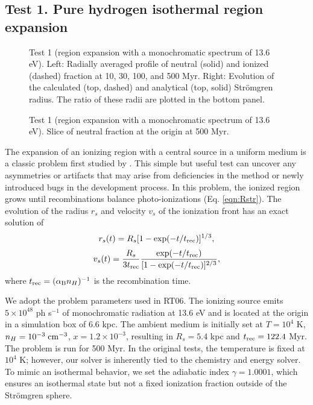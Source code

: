 \documentclass[useAMS,usenatbib]{mn2e}
\begin{document}
\subsection{Test 1. Pure hydrogen isothermal \hii region
  expansion}
\label{sec:test1}

\begin{figure*}
  \caption{\label{fig:test1_ifront} Test 1 (\hii region
    expansion with a monochromatic spectrum of 13.6 eV).  Left:
    Radially averaged profile of neutral (solid) and ionized (dashed)
    fraction at 10, 30, 100, and 500 Myr.  Right: Evolution of the
    calculated (top, dashed) and analytical (top, solid) Str\"{o}mgren
    radius.  The ratio of these radii are plotted in the bottom panel.}
\end{figure*}

\begin{figure}
  \caption{\label{fig:test1_HI} Test 1 (\hii region expansion
    with a monochromatic spectrum of 13.6 eV). Slice of neutral
    fraction at the origin at 500 Myr.}
\end{figure}

The expansion of an ionizing region with a central source in a uniform
medium is a classic problem first studied by \citet{Stroemgren39}.
This simple but useful test can uncover any asymmetries or artifacts
that may arise from deficiencies in the method or newly introduced
bugs in the development process.  In this problem, the ionized region
grows until recombinations balance photo-ionizations
(Eq. \ref{eqn:Rstr}).  The evolution of the radius $r_s$ and velocity
$v_s$ of the ionization front has an exact solution of
%
\begin{equation}
  \label{eqn:rstr}
  r_s(t) = R_s [ 1 - \exp(-t/t_{\rm rec}) ]^{1/3},
\end{equation}
\begin{equation}
  \label{eqn:vstr}
  v_s(t) = \frac{R_s}{3t_{\rm rec}} \frac{\exp(-t/t_{\rm rec})} {[1 -
    \exp(-t/t_{\rm rec})]^{2/3}},
\end{equation}
where $t_{\rm rec} = (\alpha_{\rm B} n_H)^{-1}$ is the recombination
time.

We adopt the problem parameters used in RT06.  The ionizing
source emits $5 \times 10^{48}$ ph s$^{-1}$ of monochromatic radiation
at 13.6 eV and is located at the origin in a simulation box of 6.6
kpc.  The ambient medium is initially set at $T=10^4$ K, $n_H =
10^{-3}\;\cubecm$, $x = 1.2 \times 10^{-3}$, resulting in $R_s = 5.4$
kpc and $t_{\rm rec} = 122.4$ Myr.  The problem is run for 500 Myr.
In the original tests, the temperature is fixed at $10^4$ K; however,
our solver is inherently tied to the chemistry and energy solver.  To
mimic an isothermal behavior, we set the adiabatic index $\gamma =
1.0001$, which ensures an isothermal state but not a fixed ionization
fraction outside of the Str\"{o}mgren sphere.
\end{document}
